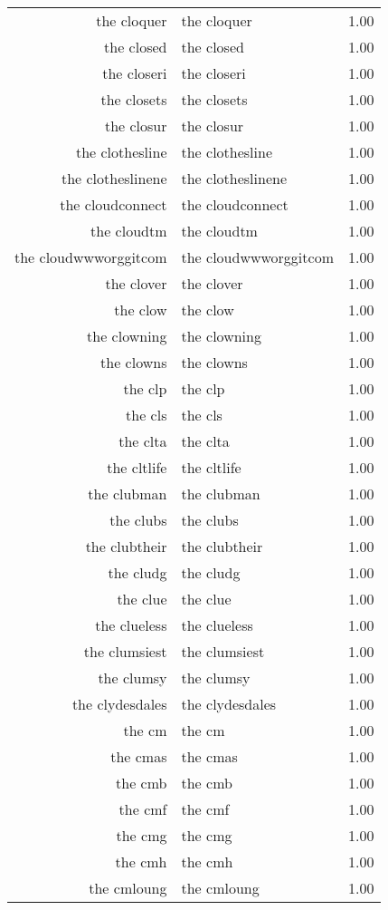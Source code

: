 \begin{table}[ht]
\begin{tabular}{rlr}
  the cloquer & the cloquer & 1.00 \\ 
  the closed & the closed & 1.00 \\ 
  the closeri & the closeri & 1.00 \\ 
  the closets & the closets & 1.00 \\ 
  the closur & the closur & 1.00 \\ 
  the clothesline & the clothesline & 1.00 \\ 
  the clotheslinene & the clotheslinene & 1.00 \\ 
  the cloudconnect & the cloudconnect & 1.00 \\ 
  the cloudtm & the cloudtm & 1.00 \\ 
  the cloudwwworggitcom & the cloudwwworggitcom & 1.00 \\ 
  the clover & the clover & 1.00 \\ 
  the clow & the clow & 1.00 \\ 
  the clowning & the clowning & 1.00 \\ 
  the clowns & the clowns & 1.00 \\ 
  the clp & the clp & 1.00 \\ 
  the cls & the cls & 1.00 \\ 
  the clta & the clta & 1.00 \\ 
  the cltlife & the cltlife & 1.00 \\ 
  the clubman & the clubman & 1.00 \\ 
  the clubs & the clubs & 1.00 \\ 
  the clubtheir & the clubtheir & 1.00 \\ 
  the cludg & the cludg & 1.00 \\ 
  the clue & the clue & 1.00 \\ 
  the clueless & the clueless & 1.00 \\ 
  the clumsiest & the clumsiest & 1.00 \\ 
  the clumsy & the clumsy & 1.00 \\ 
  the clydesdales & the clydesdales & 1.00 \\ 
  the cm & the cm & 1.00 \\ 
  the cmas & the cmas & 1.00 \\ 
  the cmb & the cmb & 1.00 \\ 
  the cmf & the cmf & 1.00 \\ 
  the cmg & the cmg & 1.00 \\ 
  the cmh & the cmh & 1.00 \\ 
  the cmloung & the cmloung & 1.00 \\ 

\end{tabular}
\end{table}
